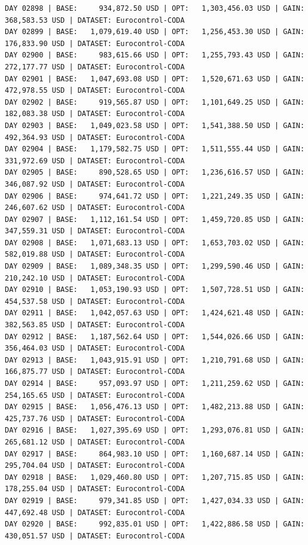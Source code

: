 \documentclass[11pt,a4paper]{article}
\begin{document}
\begin{verbatim}
DAY 02898 | BASE:     934,872.50 USD | OPT:   1,303,456.03 USD | GAIN: 368,583.53 USD | DATASET: Eurocontrol-CODA
DAY 02899 | BASE:   1,079,619.40 USD | OPT:   1,256,453.30 USD | GAIN: 176,833.90 USD | DATASET: Eurocontrol-CODA
DAY 02900 | BASE:     983,615.66 USD | OPT:   1,255,793.43 USD | GAIN: 272,177.77 USD | DATASET: Eurocontrol-CODA
DAY 02901 | BASE:   1,047,693.08 USD | OPT:   1,520,671.63 USD | GAIN: 472,978.55 USD | DATASET: Eurocontrol-CODA
DAY 02902 | BASE:     919,565.87 USD | OPT:   1,101,649.25 USD | GAIN: 182,083.38 USD | DATASET: Eurocontrol-CODA
DAY 02903 | BASE:   1,049,023.58 USD | OPT:   1,541,388.50 USD | GAIN: 492,364.93 USD | DATASET: Eurocontrol-CODA
DAY 02904 | BASE:   1,179,582.75 USD | OPT:   1,511,555.44 USD | GAIN: 331,972.69 USD | DATASET: Eurocontrol-CODA
DAY 02905 | BASE:     890,528.65 USD | OPT:   1,236,616.57 USD | GAIN: 346,087.92 USD | DATASET: Eurocontrol-CODA
DAY 02906 | BASE:     974,641.72 USD | OPT:   1,221,249.35 USD | GAIN: 246,607.62 USD | DATASET: Eurocontrol-CODA
DAY 02907 | BASE:   1,112,161.54 USD | OPT:   1,459,720.85 USD | GAIN: 347,559.31 USD | DATASET: Eurocontrol-CODA
DAY 02908 | BASE:   1,071,683.13 USD | OPT:   1,653,703.02 USD | GAIN: 582,019.88 USD | DATASET: Eurocontrol-CODA
DAY 02909 | BASE:   1,089,348.35 USD | OPT:   1,299,590.46 USD | GAIN: 210,242.10 USD | DATASET: Eurocontrol-CODA
DAY 02910 | BASE:   1,053,190.93 USD | OPT:   1,507,728.51 USD | GAIN: 454,537.58 USD | DATASET: Eurocontrol-CODA
DAY 02911 | BASE:   1,042,057.63 USD | OPT:   1,424,621.48 USD | GAIN: 382,563.85 USD | DATASET: Eurocontrol-CODA
DAY 02912 | BASE:   1,187,562.64 USD | OPT:   1,544,026.66 USD | GAIN: 356,464.03 USD | DATASET: Eurocontrol-CODA
DAY 02913 | BASE:   1,043,915.91 USD | OPT:   1,210,791.68 USD | GAIN: 166,875.77 USD | DATASET: Eurocontrol-CODA
DAY 02914 | BASE:     957,093.97 USD | OPT:   1,211,259.62 USD | GAIN: 254,165.65 USD | DATASET: Eurocontrol-CODA
DAY 02915 | BASE:   1,056,476.13 USD | OPT:   1,482,213.88 USD | GAIN: 425,737.76 USD | DATASET: Eurocontrol-CODA
DAY 02916 | BASE:   1,027,395.69 USD | OPT:   1,293,076.81 USD | GAIN: 265,681.12 USD | DATASET: Eurocontrol-CODA
DAY 02917 | BASE:     864,983.10 USD | OPT:   1,160,687.14 USD | GAIN: 295,704.04 USD | DATASET: Eurocontrol-CODA
DAY 02918 | BASE:   1,029,460.80 USD | OPT:   1,207,715.85 USD | GAIN: 178,255.04 USD | DATASET: Eurocontrol-CODA
DAY 02919 | BASE:     979,341.85 USD | OPT:   1,427,034.33 USD | GAIN: 447,692.48 USD | DATASET: Eurocontrol-CODA
DAY 02920 | BASE:     992,835.01 USD | OPT:   1,422,886.58 USD | GAIN: 430,051.57 USD | DATASET: Eurocontrol-CODA

\end{verbatim}
\end{document}
